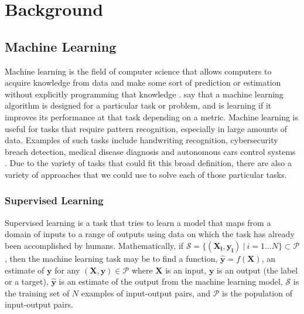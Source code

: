 \chapter{Background}
\label{bckgnd}

\section{ Machine Learning}
Machine learning is the field of computer science that allows computers to acquire knowledge from data and make some sort of prediction or estimation without explicitly programming that knowledge \cite{bishop_2013}. \citet{ai_text_book} say that a machine learning algorithm is designed for a particular task or problem, and is learning if it improves its performance at that task depending on a metric. Machine learning is useful for tasks that require pattern recognition, especially in large amounts of data.  Examples of such tasks include handwriting recognition, cybersecurity breach detection, medical disease diagnosis and autonomous cars control systems \cite{lecun1998mnist,cybersecurity,3d_conf_for_alzheimers,driverless_cars}. Due to the variety of tasks that could fit this broad definition, there are also a variety of approaches that we could use to solve each of those particular tasks.


\subsection{Supervised Learning}
\label{supervised}

Supervised learning is a task that tries to learn a model that maps from a domain of inputs to a range of outputs using data on which the task has already been accomplished by humans. Mathematically, if $\mathcal{S} =\{ ( \mathbf{X_i}, \mathbf{y_i} ) \ | \ i = 1...N\} \subset \mathcal{P}$, then the machine learning task may be to find a function, $ \mathbf{\hat{y}} = f(\mathbf{X}) $, an estimate of $\mathbf{y}$ for any $(\mathbf{X}, \mathbf{y}) \in \mathcal{P}$ where $\mathbf{X}$ is an input, $\mathbf{y}$ is an output (the label or a target), $\mathbf{\hat{y}}$  is an estimate of the output from the machine learning model, $\mathcal{S}$ is the training set of $N$ examples of input-output pairs, and $\mathcal{P}$ is the population of input-output pairs. 

